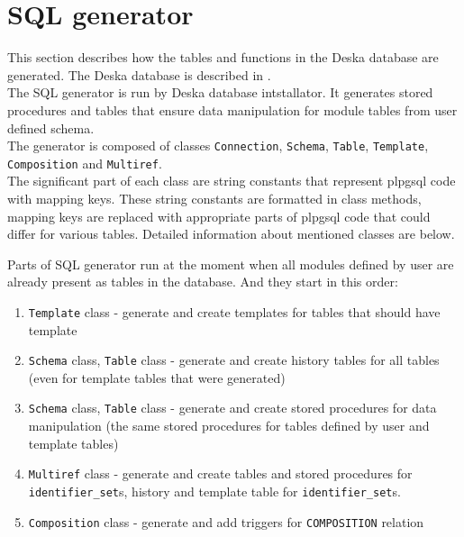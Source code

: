 \documentclass[deska]{subfiles}
\begin{document}
\label{sec:sql-procedures}

\section{SQL generator}
\label{sec:sql-generator}
This section describes how the tables and functions in the Deska database are generated. The Deska database is described in .\\
The SQL generator is run by Deska database intstallator. It generates stored procedures and tables that ensure data manipulation for module tables from user defined schema.\\

The generator is composed of classes {\tt Connection}, {\tt Schema}, {\tt Table}, {\tt Template}, {\tt Composition} and {\tt Multiref}.\\
The significant part of each class are string constants that represent plpgsql code with mapping keys. These string constants are formatted in class methods, mapping keys are replaced with appropriate parts of plpgsql code that could differ for various tables.
Detailed information about mentioned classes are below.

Parts of SQL generator run at the moment when all modules defined by user are already present as tables in the database. And they start in this order:

\begin{enumerate}
    \item {\tt Template} class - generate and create templates for tables that should have template
    \item {\tt Schema} class, {\tt Table} class - generate and create history tables for all tables (even for template tables that were generated)
    \item {\tt Schema} class, {\tt Table} class - generate and create stored procedures for data manipulation (the same stored procedures for tables defined by user and template tables)
    \item {\tt Multiref} class - generate and create tables and stored procedures for {\tt identifier\_set}s, history and template table for {\tt identifier\_set}s.
    \item {\tt Composition} class - generate and add triggers for {\tt COMPOSITION} relation
\end{enumerate}
\end{document}
